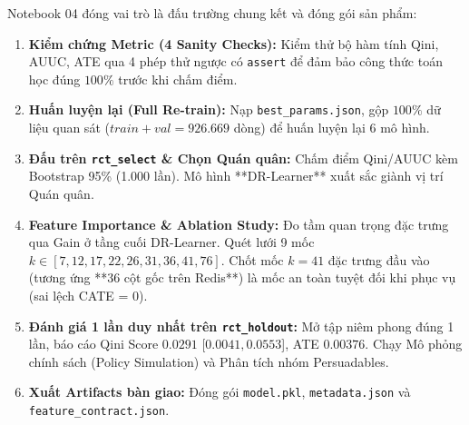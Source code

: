 Notebook 04 đóng vai trò là đấu trường chung kết và đóng gói sản phẩm:
\begin{enumerate}[leftmargin=*]
    \item \textbf{Kiểm chứng Metric (4 Sanity Checks):} Kiểm thử bộ hàm tính Qini, AUUC, ATE qua 4 phép thử ngược có \texttt{assert} để đảm bảo công thức toán học đúng $100\%$ trước khi chấm điểm.
    \item \textbf{Huấn luyện lại (Full Re-train):} Nạp \texttt{best_params.json}, gộp $100\%$ dữ liệu quan sát ($train + val = 926.669$ dòng) để huấn luyện lại 6 mô hình.
    \item \textbf{Đấu trên \texttt{rct\_select} \& Chọn Quán quân:} Chấm điểm Qini/AUUC kèm Bootstrap 95\% (1.000 lần). Mô hình **DR-Learner** xuất sắc giành vị trí Quán quân.
    \item \textbf{Feature Importance \& Ablation Study:} 
    Đo tầm quan trọng đặc trưng qua Gain ở tầng cuối DR-Learner. Quét lưới 9 mốc $k \in [7, 12, 17, 22, 26, 31, 36, 41, 76]$. Chốt mốc $k=41$ đặc trưng đầu vào (tương ứng **36 cột gốc trên Redis**) là mốc an toàn tuyệt đối khi phục vụ (sai lệch CATE = 0).
    \item \textbf{Đánh giá 1 lần duy nhất trên \texttt{rct\_holdout}:} Mở tập niêm phong đúng 1 lần, báo cáo Qini Score $\mathbf{0.0291}$ [$0.0041, 0.0553$], ATE $\mathbf{0.00376}$. Chạy Mô phỏng chính sách (Policy Simulation) và Phân tích nhóm Persuadables.
    \item \textbf{Xuất Artifacts bàn giao:} Đóng gói \texttt{model.pkl}, \texttt{metadata.json} và \texttt{feature_contract.json}.
\end{enumerate}
